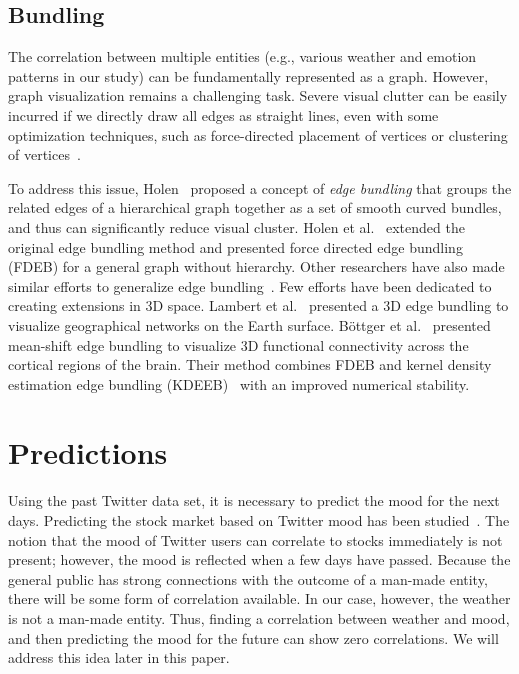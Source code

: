 \subsection{Bundling}

The correlation between multiple entities (e.g., various weather and emotion patterns in our study) can be fundamentally represented as a graph. However, graph visualization remains a challenging task. Severe visual clutter can be easily incurred if we directly draw all edges as straight lines, even with some optimization techniques, such as force-directed placement of vertices or clustering of vertices~\cite{KAUFMANN2001}.

To address this issue, Holen~\cite{holten2006hierarchical} proposed a concept of \emph{edge bundling} that groups the related edges of a hierarchical graph together as a set of smooth curved bundles, and thus can significantly reduce visual cluster. Holen et al.~\cite{holten2009force} extended the original edge bundling method and presented force directed edge bundling (FDEB) for a general graph without hierarchy. Other researchers have also made similar efforts to generalize edge bundling~\cite{cui2008geometry,telea2010image,ersoy2011skeleton,gansner2011multilevel}. Few efforts have been dedicated to creating extensions in 3D space. Lambert et al.~\cite{5571244} presented a 3D edge bundling to visualize geographical networks on the Earth surface. B\"{o}ttger et al.~\cite{bottger2014three} presented mean-shift edge bundling to visualize 3D functional connectivity across the cortical regions of the brain. Their method combines FDEB and kernel density estimation edge bundling (KDEEB)~\cite{hurter2012graph} with an improved numerical stability.

\section{Predictions}

Using the past Twitter data set, it is necessary to predict the mood for the next days. Predicting the stock market based on Twitter mood has been studied~\cite{bollen2011twitter}. The notion that the mood of Twitter users can correlate to stocks immediately is not present; however, the mood is reflected when a few days have passed. Because the general public has strong connections with the outcome of a man-made entity, there will be some form of correlation available. In our case, however, the weather is not a man-made entity. Thus, finding a correlation between weather and mood, and then predicting the mood for the future can show zero correlations. We will address this idea later in this paper.
